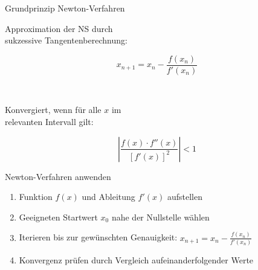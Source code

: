 \begin{concept}{Grundprinzip Newton-Verfahren}
    \vspace{-2mm}\\
\begin{minipage}[t]{0.6\textwidth}
    Approximation der NS durch \\ sukzessive Tangentenberechnung:
\end{minipage}
\begin{minipage}{0.3\textwidth}
    \vspace{-3mm}
    $$x_{n+1} = x_n - \frac{f(x_n)}{f'(x_n)}$$
\end{minipage}
\vspace{-2mm}\\
\begin{minipage}[t]{0.6\textwidth}
    Konvergiert, wenn für alle $x$ im \\ relevanten Intervall gilt:
\end{minipage}
\begin{minipage}{0.3\textwidth}
    \vspace{-3mm}
    $$\left|\frac{f(x) \cdot f''(x)}{[f'(x)]^2}\right| < 1$$
\end{minipage}
\end{concept}

\begin{KR}{Newton-Verfahren anwenden}
\begin{enumerate}
    \item Funktion $f(x)$ und Ableitung $f'(x)$ aufstellen
    \item Geeigneten Startwert $x_0$ nahe der Nullstelle wählen
    \item Iterieren bis zur gewünschten Genauigkeit:
    $x_{n+1} = x_n - \frac{f(x_n)}{f'(x_n)}$
    \item Konvergenz prüfen durch Vergleich aufeinanderfolgender Werte
\end{enumerate}
\end{KR}

